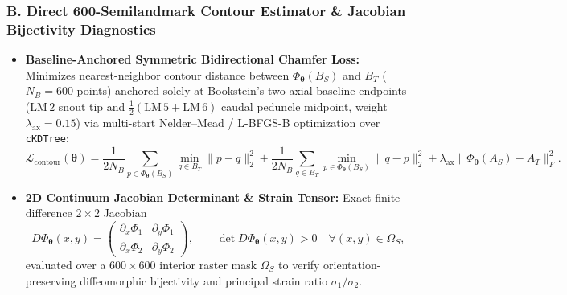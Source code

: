 \documentclass[10.5pt,a4paper]{article}
\begin{document}
\subsubsection*{B. Direct 600-Semilandmark Contour Estimator \& Jacobian Bijectivity Diagnostics}
\begin{itemize}
  \setlength{\itemsep}{3pt}
  \item \textbf{Baseline-Anchored Symmetric Bidirectional Chamfer Loss:} Minimizes nearest-neighbor contour distance between $\Phi_{\bm{\theta}}(B_S)$ and $B_T$ ($N_B = 600$ points) anchored solely at Bookstein's two axial baseline endpoints ($\mathrm{LM}\,2$ snout tip and $\tfrac{1}{2}(\mathrm{LM}\,5 + \mathrm{LM}\,6)$ caudal peduncle midpoint, weight $\lambda_{\mathrm{ax}} = 0.15$) via multi-start Nelder--Mead / L-BFGS-B optimization over \texttt{cKDTree}:
  \[
    \mathcal{L}_{\mathrm{contour}}(\bm{\theta}) = \frac{1}{2 N_B} \sum_{p \in \Phi_{\bm{\theta}}(B_S)} \min_{q \in B_T} \|p - q\|_2^2 + \frac{1}{2 N_B} \sum_{q \in B_T} \min_{p \in \Phi_{\bm{\theta}}(B_S)} \|q - p\|_2^2 + \lambda_{\mathrm{ax}} \|\Phi_{\bm{\theta}}(A_S) - A_T\|_F^2.
  \]
  \item \textbf{2D Continuum Jacobian Determinant \& Strain Tensor:} Exact finite-difference $2 \times 2$ Jacobian
  \[
    D\Phi_{\bm{\theta}}(x, y) = \begin{pmatrix} \partial_x \Phi_1 & \partial_y \Phi_1 \\ \partial_x \Phi_2 & \partial_y \Phi_2 \end{pmatrix}, \qquad \det D\Phi_{\bm{\theta}}(x, y) > 0 \quad \forall (x, y) \in \Omega_S,
  \]
  evaluated over a $600 \times 600$ interior raster mask $\Omega_S$ to verify orientation-preserving diffeomorphic bijectivity and principal strain ratio $\sigma_1 / \sigma_2$.
\end{itemize}
\end{document}
